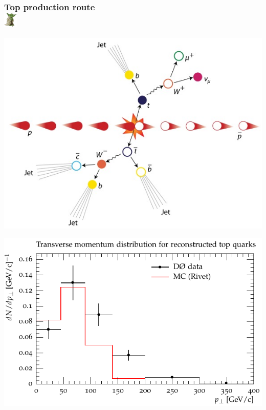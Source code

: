 \documentclass{beamer}
\begin{document}
  \begin{frame}
    \frametitle{Top production route \ \ \ \ \ \ \ \ \ \ \ \ \ \ \ \ \ \ \ \ \ \ \ \ \ \ \ \ \ \ \ \   \includegraphics[width=0.05\textwidth]{yoda-logo}}
    \includegraphics[height=0.89\textheight]{ttbar.jpg}
  \end{frame}

  \begin{frame}
    \includegraphics[width=\textwidth]{top_paper}
  \end{frame}
\end{document}
